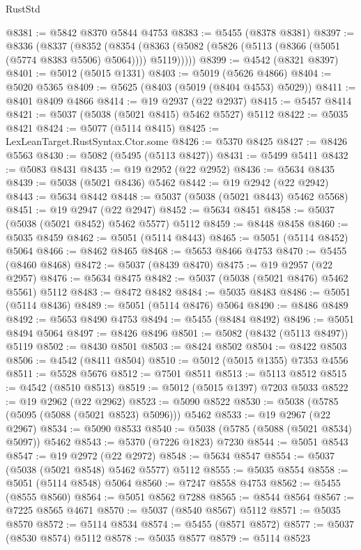 \begin{lexlean}{RustStd}
\begin{coremodule}
@8381 := @5842 @8370 @5844 @4753
@8383 := @5455 (@8378 @8381)
@8397 := @8336
    (@8337
      (@8352
        (@8354 (@8363 (@5082 (@5826 (@5113 (@8366 (@5051 (@5774 @8383 @5506) @5064)))) @5119)))))
@8399 := @4542 (@8321 @8397)
@8401 := @5012 (@5015 @1331)
@8403 := @5019 (@5626 @4866)
@8404 := @5020 @5365
@8409 := @5625 (@8403 (@5019 (@8404 @4553) @5029))
@8411 := @8401 @8409 @4866
@8414 := @19 @2937 (@22 @2937)
@8415 := @5457 @8414
@8421 := @5037 (@5038 (@5021 @8415) @5462 @5527) @5112
@8422 := @5035 @8421
@8424 := @5077 (@5114 @8415)
@8425 := LexLeanTarget.RustSyntax.Ctor.some
@8426 := @5370 @8425
@8427 := @8426 @5563
@8430 := @5082 (@5495 (@5113 @8427))
@8431 := @5499 @5411
@8432 := @5083 @8431
@8435 := @19 @2952 (@22 @2952)
@8436 := @5634 @8435
@8439 := @5038 (@5021 @8436) @5462
@8442 := @19 @2942 (@22 @2942)
@8443 := @5634 @8442
@8448 := @5037 (@5038 (@5021 @8443) @5462 @5568)
@8451 := @19 @2947 (@22 @2947)
@8452 := @5634 @8451
@8458 := @5037 (@5038 (@5021 @8452) @5462 @5577) @5112
@8459 := @8448 @8458
@8460 := @5035 @8459
@8462 := @5051 (@5114 @8443)
@8465 := @5051 (@5114 @8452) @5064
@8466 := @8462 @8465
@8468 := @5653 @8466 @4753
@8470 := @5455 (@8460 @8468)
@8472 := @5037 (@8439 @8470)
@8475 := @19 @2957 (@22 @2957)
@8476 := @5634 @8475
@8482 := @5037 (@5038 (@5021 @8476) @5462 @5561) @5112
@8483 := @8472 @8482
@8484 := @5035 @8483
@8486 := @5051 (@5114 @8436)
@8489 := @5051 (@5114 @8476) @5064
@8490 := @8486 @8489
@8492 := @5653 @8490 @4753
@8494 := @5455 (@8484 @8492)
@8496 := @5051 @8494 @5064
@8497 := @8426 @8496
@8501 := @5082 (@8432 (@5113 @8497)) @5119
@8502 := @8430 @8501
@8503 := @8424 @8502
@8504 := @8422 @8503
@8506 := @4542 (@8411 @8504)
@8510 := @5012 (@5015 @1355) @7353 @4556
@8511 := @5528 @5676
@8512 := @7501 @8511
@8513 := @5113 @8512
@8515 := @4542 (@8510 @8513)
@8519 := @5012 (@5015 @1397) @7203 @5033
@8522 := @19 @2962 (@22 @2962)
@8523 := @5090 @8522
@8530 := @5038 (@5785 (@5095 (@5088 (@5021 @8523) @5096))) @5462
@8533 := @19 @2967 (@22 @2967)
@8534 := @5090 @8533
@8540 := @5038 (@5785 (@5088 (@5021 @8534) @5097)) @5462
@8543 := @5370 (@7226 @1823) @7230
@8544 := @5051 @8543
@8547 := @19 @2972 (@22 @2972)
@8548 := @5634 @8547
@8554 := @5037 (@5038 (@5021 @8548) @5462 @5577) @5112
@8555 := @5035 @8554
@8558 := @5051 (@5114 @8548) @5064
@8560 := @7247 @8558 @4753
@8562 := @5455 (@8555 @8560)
@8564 := @5051 @8562 @7288
@8565 := @8544 @8564
@8567 := @7225 @8565 @4671
@8570 := @5037 (@8540 @8567) @5112
@8571 := @5035 @8570
@8572 := @5114 @8534
@8574 := @5455 (@8571 @8572)
@8577 := @5037 (@8530 @8574) @5112
@8578 := @5035 @8577
@8579 := @5114 @8523

\end{coremodule}
\end{lexlean}
